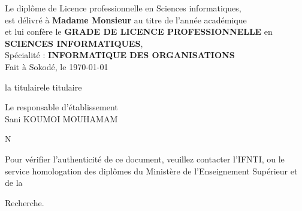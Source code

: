 \documentclass[a4paper, landscape, 10pt]{article}
\begin{document}
\noindent
Le diplôme de Licence professionnelle en Sciences informatiques,\\
est délivré à \textbf{Madame Monsieur  } au titre de l'année académique \\
et lui confère le \textbf{GRADE DE LICENCE PROFESSIONNELLE} en \textbf{SCIENCES INFORMATIQUES},\\
Spécialité : \textbf{INFORMATIQUE DES ORGANISATIONS}\\

Fait à Sokodé, le \today \\

\vspace{0.5cm}


\noindent
\begin{minipage}{0.49\textwidth}
	\begin{center}
		la titulairele titulaire\\
		\vspace{2cm}
		 
	\end{center}
\end{minipage}\hfill
\begin{minipage}{0.49\textwidth}
	\begin{center}
		Le responsable d'établissement\\
		\vspace{2cm}
		Sani KOUMOI MOUHAMAM
	\end{center}
\end{minipage}

\vspace{1.5cm}
\noindent
N\textdegree {}


\newpage


\vspace*{5cm}
\begin{center}
	\begin{minipage}{25cm}
		Pour vérifier l’authenticité de ce document, veuillez contacter l’IFNTI,
	ou le service homologation des diplômes du Ministère de l’Enseignement Supérieur et de la
	\end{minipage}
\end{center}
\vspace*{-0.7cm}
\begin{center}
	\begin{minipage}{25cm}
		\hspace{11.3cm}Recherche.
	\end{minipage}
\end{center}


\begin{center}
	
	
\end{center}
\end{document}
